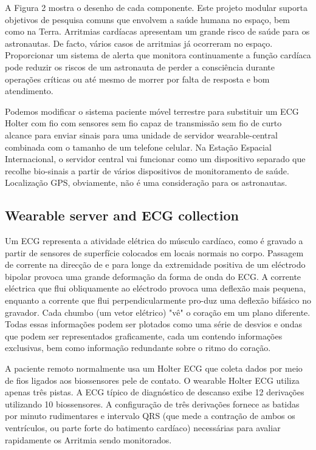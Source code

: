 \documentclass[12pt]{article} %
\begin{document}
A Figura 2 mostra o desenho de cada componente.
Este projeto modular suporta objetivos de pesquisa comuns que envolvem a saúde humana no espaço, bem como na Terra. Arritmias cardíacas apresentam um grande risco de saúde para os astronautas. De facto, vários casos de arritmias já ocorreram no espaço. Proporcionar um sistema de alerta que monitora continuamente a função cardíaca pode reduzir os riscos de um astronauta de perder a consciência durante operações críticas ou até mesmo de morrer por falta de resposta e bom atendimento.

Podemos modificar o sistema paciente móvel terrestre para substituir um ECG Holter com fio com sensores sem fio capaz de transmissão sem fio de curto alcance para enviar sinais para uma unidade de servidor wearable-central combinada com o tamanho de um telefone celular. Na Estação Espacial Internacional, o servidor central vai funcionar como um dispositivo separado que recolhe bio-sinais a partir de vários dispositivos de monitoramento de saúde. Localização GPS, obviamente, não é uma consideração para os astronautas.


\subsection{Wearable server and ECG collection} %

Um ECG representa a atividade elétrica do músculo cardíaco, como é gravado a partir de sensores de superfície colocados em locais normais no corpo. Passagem de corrente na direcção de e para longe da extremidade positiva de um eléctrodo bipolar provoca uma grande deformação da forma de onda do ECG. A corrente eléctrica que flui obliquamente ao eléctrodo provoca uma deflexão mais pequena, enquanto a corrente que flui perpendicularmente pro-duz uma deflexão bifásico no gravador. Cada chumbo (um vetor elétrico) "vê" o coração em um plano diferente. Todas essas informações podem ser plotados como uma série de desvios e ondas que podem ser representados graficamente, cada um contendo informações exclusivas, bem como informação redundante sobre o ritmo do coração.

A paciente remoto normalmente usa um Holter ECG que coleta dados por meio de fios ligados aos biossensores pele de contato. O wearable Holter ECG utiliza apenas três pistas. A ECG típico de diagnóstico de descanso exibe 12 derivações utilizando 10 biossensores. A configuração de três derivações fornece as batidas por minuto rudimentares e intervalo QRS (que mede a contração de ambos os ventrículos, ou parte forte do batimento cardíaco) necessárias para avaliar rapidamente os Arritmia sendo monitorados.
\end{document}
